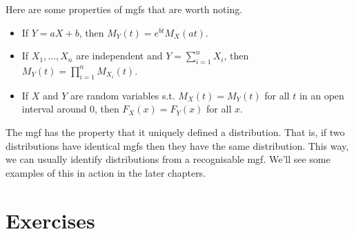 \documentclass[
]{book}
\providecommand{\tightlist}{%
  \setlength{\itemsep}{0pt}\setlength{\parskip}{0pt}}
\theoremstyle{definition}
\theoremstyle{definition}
\theoremstyle{definition}
\theoremstyle{definition}
\theoremstyle{remark}
\begin{document}
Here are some properties of mgfs that are worth noting.

\begin{itemize}
\tightlist
\item
  If \(Y=aX+b\), then \(M_Y(t)=e^{bt}M_X(at)\).
\item
  If \(X_1,\dots,X_n\) are independent and \(Y=\sum_{i=1}^n X_i\), then \(M_Y(t)=\prod_{i=1}^n M_{X_i}(t)\).
\item
  If \(X\) and \(Y\) are random variables s.t. \(M_X(t)=M_Y(t)\) for all \(t\) in an open interval around 0, then \(F_X(x)=F_Y(x)\) for all \(x\).
\end{itemize}

The mgf has the property that it uniquely defined a distribution.
That is, if two distributions have identical mgfs then they have the same distribution.
This way, we can usually identify distributions from a recognisable mgf.
We'll see some examples of this in action in the later chapters.

\hypertarget{exercises}{%
\section{Exercises}\label{exercises}}
\end{document}
